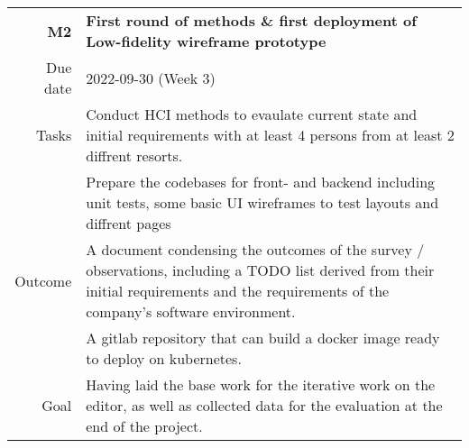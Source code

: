 \begin{table}[htbp]
\small
\colorbox{usethiscolorhere}{
\centering
\begin{tabularx}{\textwidth}{@{} r Y @{}}
	\textbf{M2}
	& \textbf{First round of methods \& first deployment of Low-fidelity wireframe prototype}\vspace{2mm}\\
	Due date & 2022-09-30 (Week $3$)\vspace{2mm}\\
     Tasks & Conduct HCI methods to evaulate current state and initial requirements with at least 4 persons from at least 2 diffrent resorts.\\
     & Prepare the codebases for front- and backend including unit tests, some basic UI wireframes to test layouts and diffrent pages\vspace{2mm}\\
    Outcome & A document condensing the outcomes of the survey / observations, including a TODO list derived from their initial requirements and the requirements of the company's software environment.\\
    & A gitlab repository that can build a docker image ready to deploy on kubernetes.\vspace{2mm}\\
    Goal & Having laid the base work for the iterative work on the editor, as well as collected data for the evaluation at the end of the project.\vspace{2mm}\\
    
\end{tabularx}
}
\end{table}


